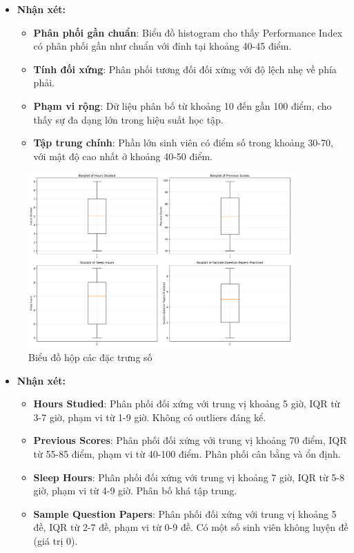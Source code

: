 \begin{itemize}
	\item \textbf{Nhận xét:}
	      \begin{itemize}
		      \item \textbf{Phân phối gần chuẩn}: Biểu đồ histogram cho thấy Performance Index có phân phối gần như chuẩn với đỉnh tại khoảng 40-45 điểm.
		      \item \textbf{Tính đối xứng}: Phân phối tương đối đối xứng với độ lệch nhẹ về phía phải.
		      \item \textbf{Phạm vi rộng}: Dữ liệu phân bố từ khoảng 10 đến gần 100 điểm, cho thấy sự đa dạng lớn trong hiệu suất học tập.
		      \item \textbf{Tập trung chính}: Phần lớn sinh viên có điểm số trong khoảng 30-70, với mật độ cao nhất ở khoảng 40-50 điểm.
	      \end{itemize}
\end{itemize}

\begin{figure}[H]
	\centering
	\includegraphics[width=0.9\textwidth]{imgs/figures/figure2_boxplots_numerical_features.png}
	\caption{Biểu đồ hộp các đặc trưng số}
	\label{fig:boxplots}
\end{figure}

\begin{itemize}
	\item \textbf{Nhận xét:}
	      \begin{itemize}
		      \item \textbf{Hours Studied}: Phân phối đối xứng với trung vị khoảng 5 giờ, IQR từ 3-7 giờ, phạm vi từ 1-9 giờ. Không có outliers đáng kể.
		      \item \textbf{Previous Scores}: Phân phối đối xứng với trung vị khoảng 70 điểm, IQR từ 55-85 điểm, phạm vi từ 40-100 điểm. Phân phối cân bằng và ổn định.
		      \item \textbf{Sleep Hours}: Phân phối đối xứng với trung vị khoảng 7 giờ, IQR từ 5-8 giờ, phạm vi từ 4-9 giờ. Phân bố khá tập trung.
		      \item \textbf{Sample Question Papers}: Phân phối đối xứng với trung vị khoảng 5 đề, IQR từ 2-7 đề, phạm vi từ 0-9 đề. Có một số sinh viên không luyện đề (giá trị 0).
	      \end{itemize}
\end{itemize}

